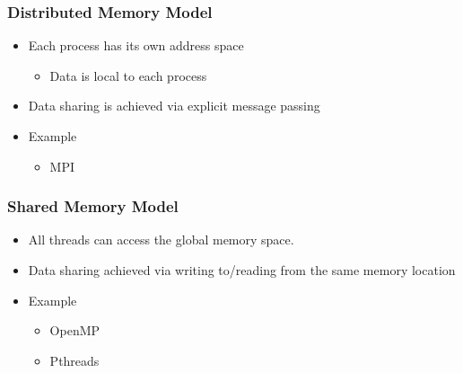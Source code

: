 \documentclass[10pt,t]{beamer}
\begin{document}
\begin{frame}
  \frametitle{Distributed Memory Model}
  \begin{itemize}
  \item Each process has its own address space
    \begin{itemize}
    \item Data is local to each process
    \end{itemize}
  \item Data sharing is achieved via explicit message passing
  \item Example
    \begin{itemize}
    \item MPI
    \end{itemize}
  \end{itemize}
  
\end{frame}

\begin{frame}
  \frametitle{Shared Memory Model}
  \begin{itemize}
  \item All threads can access the global memory space.
  \item Data sharing achieved via writing to/reading from the same memory location
  \item Example
    \begin{itemize}
    \item OpenMP
    \item Pthreads
    \end{itemize}
  \end{itemize}
  
\end{frame}
\end{document}
